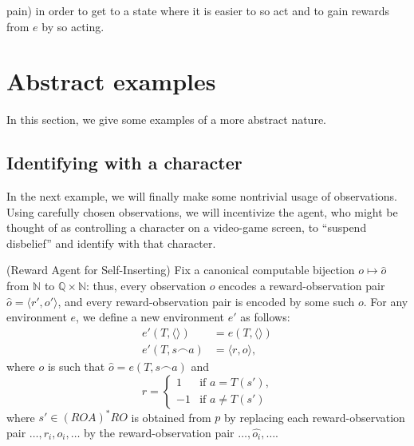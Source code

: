 \documentclass[runningheads]{llncs}
\begin{document}
\begin{example}
\begin{itemize}
        pain) in order to get to a state where it is easier to so act and
        to gain rewards from $e$ by so acting.
    \end{itemize}
\end{example}


\section{Abstract examples}

In this section, we give some examples of a more abstract nature.

\subsection{Identifying with a character}

In the next example,
we will finally make some nontrivial usage of observations. Using carefully chosen
observations, we will incentivize the agent, who might be thought of as
controlling a character on a video-game screen,
to ``suspend disbelief'' and identify with that character.

\begin{example}
\label{selfinsertionexample}
    (Reward Agent for Self-Inserting)
    Fix a canonical computable bijection
    $o\mapsto \hat o$
    from $\mathbb N$ to $\mathbb Q\times \mathbb N$:
    thus, every observation $o$ encodes a reward-observation pair
    $\hat o = \langle r',o'\rangle$, and every reward-observation pair
    is encoded by some such $o$.
    For any environment $e$, we define
    a new environment $e'$ as follows:
    \begin{align*}
        e'(T,\langle\rangle) &= e(T,\langle\rangle)\\
        e'(T,s\frown a) &= \langle r,o\rangle,
    \end{align*}
    where $o$ is such that $\hat o = e(T,s\frown a)$ and
    \[
        r =
        \begin{cases}
            1 & \mbox{if $a=T(s')$,}\\
            -1 & \mbox{if $a\not=T(s')$}
        \end{cases}
    \]
    where
    $s'\in (ROA)^*RO$ is obtained from $p$
    by replacing each reward-observation pair
    $\ldots,r_i,o_i,\ldots$ by the reward-observation
    pair $\ldots,\widehat{o_i},\ldots$.
\end{example}
\end{document}
